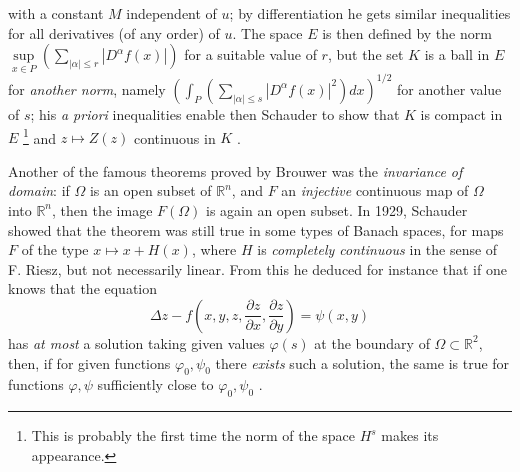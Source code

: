 \documentclass[12pt,a4paper,leqno,twoside]{extbook}
\newcommand{\R}{\mathbb{R}}
\newcommand{\pder}[2]{\frac{\partial #1}{\partial #2}}
\begin{document}
with a constant \(M\) independent of \(u\); by differentiation he gets similar inequalities for all derivatives (of any order) of \(u\). The space \(E\) is then defined by the norm \(\sup\limits_{x \in P} \left( \sum\limits_{|\alpha| \leq r} |D^\alpha f(x)| \right)\) for a suitable value of \(r\), but the set \(K\) is a ball in \(E\) for \emph{another norm}, namely \(\left( \int_P \left( \sum_{|\alpha| \leq s} |D^\alpha f(x)|^2 \right) dx \right)^{1/2}\) for another value of \(s\); his \emph{a priori} inequalities enable then Schauder to show that \(K\) is compact in \(E\) \footnote{This is probably the first time the norm of the space \(H^s\) makes its appearance.} and \(z \mapsto Z(z)\) continuous in \(K\) \cite{190}.

Another of the famous theorems proved by Brouwer was the \emph{invariance of domain}: if \(\Omega\) is an open subset of \(\R^n\), and \(F\) an \emph{injective} continuous map of \(\Omega\) into \(\R^n\), then the image \(F(\Omega)\) is again an open subset. In 1929, Schauder showed that the theorem was still true in some types of Banach spaces, for maps \(F\) of the type \(x \mapsto x + H(x)\), where \(H\) is \emph{completely continuous} in the sense of F. Riesz, but not necessarily linear. From this he deduced for instance that if one knows that the equation
\begin{equation}
    \label{eq:9.7}
    \Delta z - f \left( x, y, z, \pder{z}{x}, \pder{z}{y} \right) = \psi(x, y)
\end{equation}
has \emph{at most} a solution taking given values \(\varphi(s)\) at the boundary of \(\Omega \subset \R^2\), then, if for given functions \(\varphi_0, \psi_0\) there \emph{exists} such a solution, the same is true for functions \(\varphi, \psi\) sufficiently close to \(\varphi_0, \psi_0\) \cite{189}.
\end{document}
